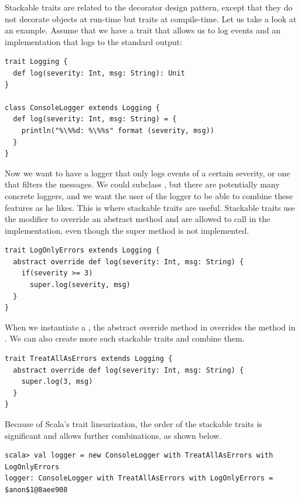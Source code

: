 \documentclass[10pt,a4paper,oneside]{scrreprt}
\begin{document}
{Stackable traits are related to the decorator design pattern, except that they do not decorate objects at run-time but traits at compile-time. Let us take a look at an example. Assume that we have a trait that allows us to log events and an implementation that logs to the standard output:

\begin{lstlisting}
trait Logging {
  def log(severity: Int, msg: String): Unit
}

class ConsoleLogger extends Logging {
  def log(severity: Int, msg: String) = {
    println("%\%%d: %\%%s" format (severity, msg))
  }
}
\end{lstlisting}

Now we want to have a logger that only logs events of a certain severity, or one that filters the messages. We could subclass , but there are potentially many concrete loggers, and we want the user of the logger to be able to combine these features as he likes. This is where stackable traits are useful. Stackable traits use the  modifier to override an abstract method and are allowed to call  in the implementation, even though the super method is not implemented.

\begin{lstlisting}
trait LogOnlyErrors extends Logging {
  abstract override def log(severity: Int, msg: String) {
    if(severity >= 3)
      super.log(severity, msg)
  }
}
\end{lstlisting}

When we instantiate a , the abstract override method in  overrides the  method in . We can also create more such stackable traits and combine them.

\begin{lstlisting}
trait TreatAllAsErrors extends Logging {
  abstract override def log(severity: Int, msg: String) {
    super.log(3, msg)
  }
}
\end{lstlisting}

Because of Scala's trait linearization, the order of the stackable traits is significant and allows further combinations, as shown below.

\begin{lstlisting}
scala> val logger = new ConsoleLogger with TreatAllAsErrors with LogOnlyErrors  
logger: ConsoleLogger with TreatAllAsErrors with LogOnlyErrors = $anon$1@8aee908


\end{lstlisting}}
\end{document}
